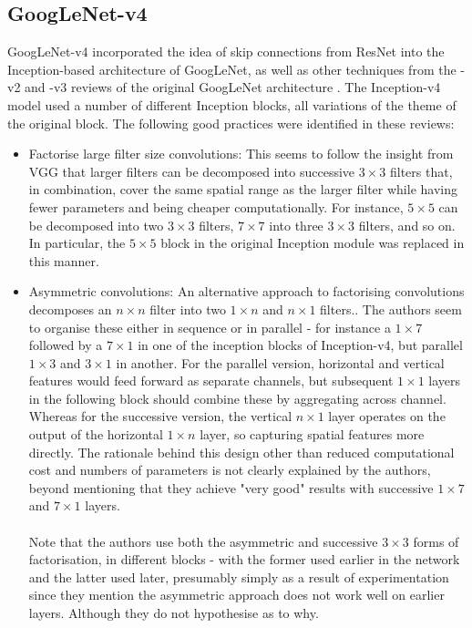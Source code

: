 \documentclass[11pt]{article} %
\theoremstyle{plain}
\theoremstyle{definition}
\begin{document}
\subsection{GoogLeNet-v4}
GoogLeNet-v4 \cite{GoogLeNet_v4_Paper} incorporated the idea of skip connections from ResNet into the Inception-based architecture of GoogLeNet, as well as other techniques from the -v2 and -v3 reviews of the original GoogLeNet architecture \cite{GoogLeNet_v3_Paper}. The Inception-v4 model used a number of different Inception blocks, all variations of the theme of the original block. The following good practices were identified in these reviews:
\begin{itemize}
    \item Factorise large filter size convolutions: This seems to follow the insight from VGG that larger filters can be decomposed into successive \(3 \times 3\) filters that, in combination, cover the same spatial range as the larger filter while having fewer parameters and being cheaper computationally. For instance, \(5 \times 5\) can be decomposed into two \(3 \times 3\) filters, \(7 \times 7\) into three \(3 \times 3\) filters, and so on. In particular, the \(5 \times 5\) block in the original Inception module was replaced in this manner.
    \item Asymmetric convolutions: An alternative approach to factorising convolutions decomposes an \(n \times n\) filter into two \(1 \times n\) and \(n \times 1\) filters.. The authors seem to organise these either in sequence or in parallel - for instance a \(1 \times 7\) followed by a \(7 \times 1\) in one of the inception blocks of Inception-v4, but parallel \(1 \times 3\) and \(3 \times 1\) in another. For the parallel version, horizontal and vertical features would feed forward as separate channels, but subsequent \(1 \times 1\) layers in the following block should combine these by aggregating across channel. Whereas for the successive version, the vertical \(n \times 1\) layer operates on the output of the horizontal \(1 \times n\) layer, so capturing spatial features more directly. The rationale behind this design other than reduced computational cost and numbers of parameters is not clearly explained by the authors, beyond mentioning that they achieve "very good" results with successive \(1 \times 7\) and \(7 \times 1\) layers.   
    \\
    \\
    \noindent
    Note that the authors use both the asymmetric and successive \(3 \times 3\) forms of factorisation, in different blocks - with the former used earlier in the network and the latter used later, presumably simply as a result of experimentation since they mention the asymmetric approach does not work well on earlier layers. Although they do not hypothesise as to why. 

\end{itemize}
\end{document}
